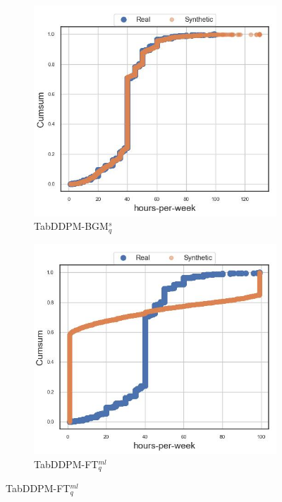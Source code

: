 \begin{figure}[H]
	\begin{subfigure}{0.3\textwidth}
		\centering
		\includegraphics[width=\textwidth]{images/cdf_hpw/tab-ddpm-bgm-simTune.jpg}
		\caption{TabDDPM-BGM$^{s}_q$}
	\end{subfigure}
	\begin{subfigure}{0.3\textwidth}
		\centering
		\includegraphics[width=\textwidth]{images/cdf_hpw/tab-ddpm-ft.jpg}
		\caption{TabDDPM-FT$^{ml}_q$}
	\end{subfigure}

\end{figure}
